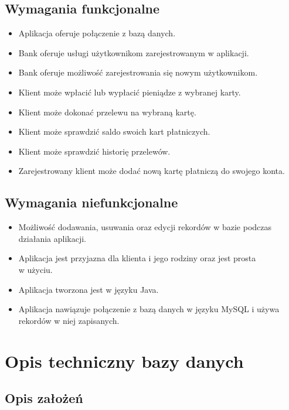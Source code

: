\documentclass[12pt, letterpaper]{article}
\begin{document}
\subsection{Wymagania funkcjonalne}
\begin{itemize}
\item Aplikacja oferuje połączenie z bazą danych.
\item Bank oferuje usługi użytkownikom zarejestrowanym w aplikacji.
\item Bank oferuje możliwość zarejestrowania się nowym użytkownikom.
\item Klient może wpłacić lub wypłacić pieniądze z wybranej karty.
\item Klient może dokonać przelewu na wybraną kartę.
\item Klient może sprawdzić saldo swoich kart płatniczych.
\item Klient może sprawdzić historię przelewów.
\item Zarejestrowany klient może dodać nową kartę płatniczą do swojego konta.
\end{itemize}


\subsection{Wymagania niefunkcjonalne}
\begin{itemize}
\item Możliwość dodawania, usuwania oraz edycji rekordów w bazie podczas działania aplikacji.
\item Aplikacja jest przyjazna dla klienta i jego rodziny oraz jest prosta\\ w użyciu.
\item Aplikacja tworzona jest w języku Java.
\item Aplikacja nawiązuje połączenie z bazą danych w języku MySQL i używa rekordów w niej zapisanych.
\end{itemize}

\newpage

\section{Opis techniczny bazy danych}

\subsection{Opis założeń}
\end{document}
